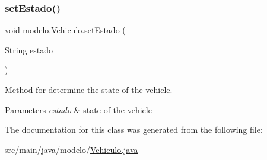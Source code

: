 \subsubsection{\texorpdfstring{set\+Estado()}{setEstado()}}
{\footnotesize\ttfamily void modelo.\+Vehiculo.\+set\+Estado (\begin{DoxyParamCaption}\item[{String}]{estado }\end{DoxyParamCaption})}



Method for determine the state of the vehicle. 


\begin{DoxyParams}{Parameters}
{\em estado} & state of the vehicle \\
\hline
\end{DoxyParams}


The documentation for this class was generated from the following file\+:\begin{DoxyCompactItemize}
\item 
src/main/java/modelo/\mbox{\hyperlink{_vehiculo_8java}{Vehiculo.\+java}}\end{DoxyCompactItemize}
